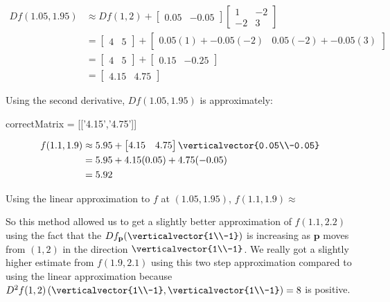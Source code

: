 \documentclass{ximera}
\begin{document}
\begin{question}
  \begin{solution}
    \begin{hint}
      \begin{align*}
        Df(1.05,1.95) &\approx Df(1,2)+\begin{bmatrix} 0.05 & -0.05\end{bmatrix}\begin{bmatrix} 1 & -2 \\ -2 & 3\end{bmatrix}\\
        &= \begin{bmatrix} 4 & 5 \end{bmatrix} + \begin{bmatrix} 0.05(1)+-0.05(-2) & 0.05(-2)+-0.05(3)\end{bmatrix}\\
        &=\begin{bmatrix} 4 & 5 \end{bmatrix} + \begin{bmatrix} 0.15 & -0.25\end{bmatrix}\\
        &=\begin{bmatrix} 4.15 & 4.75\end{bmatrix}
      \end{align*}
    \end{hint}
    Using the second derivative, $Df(1.05,1.95) $ is approximately:
    \begin{matrix-answer}
      correctMatrix = [['4.15','4.75']]
    \end{matrix-answer}
  \end{solution}

  \begin{solution}
    \begin{hint}
      \begin{align*}
        f(1.1,1.9) &\approx 5.95+\begin{bmatrix} 4.15 & 4.75 \end{bmatrix} \verticalvector{0.05\\-0.05}\\
        &=5.95+4.15(0.05)+4.75(-0.05)\\
        &=5.92
      \end{align*}
    \end{hint}
    Using the linear approximation to $f$ at $(1.05,1.95)$, $f(1.1,1.9) \approx$ 
  \end{solution}
  
  So this method allowed us to get a slightly better approximation of $f(1.1,2.2)$ using the fact that the $Df_{\mathbf{p}}(\verticalvector{1\\-1})$ is increasing
  as $\mathbf{p}$ moves from $(1,2)$ in the direction $\verticalvector{1\\-1}$.  We really got a slightly higher estimate from $f(1.9,2.1)$ using this two step
  approximation compared to using the linear approximation because 
  $D^2f(1,2)\left(\verticalvector{1\\-1},\verticalvector{1\\-1} \right) = 8$ is positive.  
  

\end{question}
\end{document}
